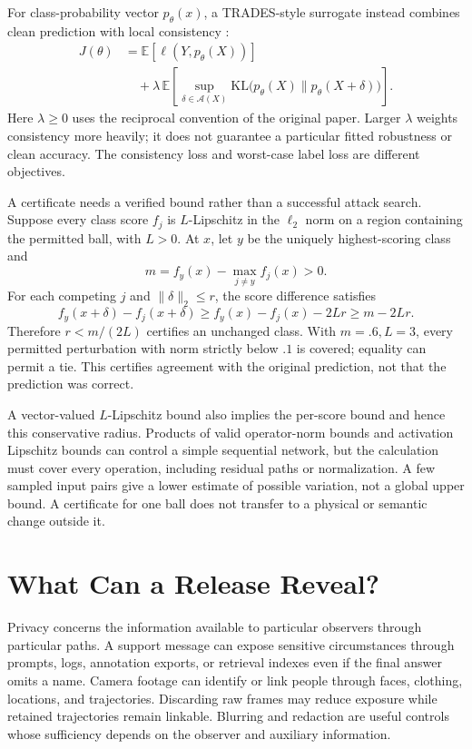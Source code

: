 For class-probability vector $p_\theta(x)$, a TRADES-style surrogate instead combines clean prediction with local consistency \citep{zhang2019trades}:
\[
\begin{aligned}
J(\theta)&=\mathbb E[\ell(Y,p_\theta(X))]\\
&\quad+\lambda\,\mathbb E\!\left[
\sup_{\delta\in\mathcal A(X)}
\mathrm{KL}\bigl(p_\theta(X)\|p_\theta(X+\delta)\bigr)\right].
\end{aligned}
\]
Here $\lambda\ge0$ uses the reciprocal convention of the original paper. Larger $\lambda$ weights consistency more heavily; it does not guarantee a particular fitted robustness or clean accuracy. The consistency loss and worst-case label loss are different objectives.

A certificate needs a verified bound rather than a successful attack search. Suppose every class score $f_j$ is $L$-Lipschitz in the $\ell_2$ norm on a region containing the permitted ball, with $L>0$. At $x$, let $y$ be the uniquely highest-scoring class and
\[
m=f_y(x)-\max_{j\ne y}f_j(x)>0.
\]
For each competing $j$ and $\|\delta\|_2\le r$, the score difference satisfies
\[
f_y(x+\delta)-f_j(x+\delta)
\ge f_y(x)-f_j(x)-2Lr\ge m-2Lr.
\]
Therefore $r<m/(2L)$ certifies an unchanged class. With $m=.6,L=3$, every permitted perturbation with norm strictly below $.1$ is covered; equality can permit a tie. This certifies agreement with the original prediction, not that the prediction was correct.

A vector-valued $L$-Lipschitz bound also implies the per-score bound and hence this conservative radius. Products of valid operator-norm bounds and activation Lipschitz bounds can control a simple sequential network, but the calculation must cover every operation, including residual paths or normalization. A few sampled input pairs give a lower estimate of possible variation, not a global upper bound. A certificate for one ball does not transfer to a physical or semantic change outside it.

\section{What Can a Release Reveal?}

Privacy concerns the information available to particular observers through particular paths. A support message can expose sensitive circumstances through prompts, logs, annotation exports, or retrieval indexes even if the final answer omits a name. Camera footage can identify or link people through faces, clothing, locations, and trajectories. Discarding raw frames may reduce exposure while retained trajectories remain linkable. Blurring and redaction are useful controls whose sufficiency depends on the observer and auxiliary information.

